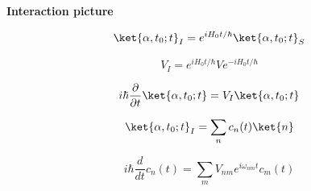 {\bf Interaction picture}

\begin{equation} %
\ket{\alpha,t_0;t}_{I} =
  e^{iH_0t/\hbar} \ket{\alpha,t_0;t}_{S}
\end{equation}

\begin{equation} %
V_I = e^{iH_0t/\hbar}Ve^{-iH_0t/\hbar}
\end{equation}

\begin{equation} %
i\hbar \frac{\partial}{\partial t} \ket{\alpha,t_0;t} = V_I \ket{\alpha,t_0;t}
\end{equation}

\begin{equation} %
\ket{\alpha,t_0;t}_I = \sum_n c_n(t) \ket{n}
\end{equation}

\begin{equation} %
i\hbar \frac{d}{dt} c_n(t)  = \sum_m V_{nm} e^{i\omega_{nm}t}c_m(t)
\end{equation}

